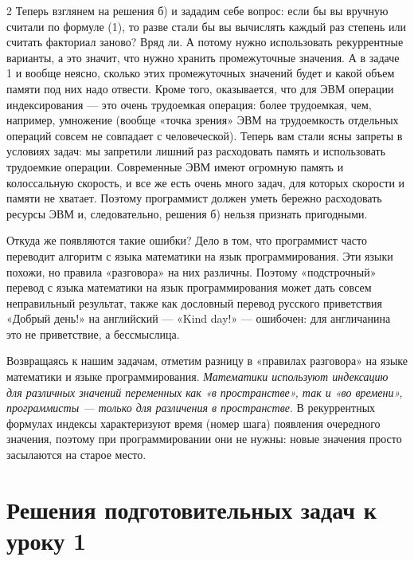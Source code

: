 \begin{multicols}{2}
\indent Теперь взглянем на решения б) и зададим себе вопрос: если бы вы вручную считали по формуле (1), то разве стали бы вы вычислять каждый раз степень или считать факториал заново? Вряд ли. А потому нужно использовать рекуррентные варианты, а это значит, что нужно хранить промежуточные значения. А в задаче 1 и вообще неясно, сколько этих промежуточных значений будет и какой объем памяти под них надо отвести. Кроме того, оказывается, что для ЭВМ операции индексирования — это очень трудоемкая операция: более трудоемкая, чем, например, умножение (вообще «точка зрения» ЭВМ на трудоемкость отдельных операций совсем не совпадает с человеческой). Теперь вам стали ясны запреты в условиях задач: мы запретили лишний раз расходовать память и использовать трудоемкие операции. Современные ЭВМ имеют огромную память и колоссальную скорость, и все же есть очень много задач, для которых скорости и памяти не хватает. Поэтому программист должен уметь бережно расходовать ресурсы ЭВМ и, следовательно, решения б) нельзя признать пригодными.

\indent Откуда же появляются такие ошибки? Дело в том, что программист часто переводит алгоритм с языка математики на язык программирования. Эти языки похожи, но правила «разговора» на них различны. Поэтому «подстрочный» перевод с языка математики на язык программирования может дать совсем неправильный результат, также как дословный перевод русского приветствия «Добрый день!» на английский — «Kind day!» — ошибочен: для англичанина это не приветствие, а бессмыслица.

\indent Возвращаясь к нашим задачам, отметим разницу в «правилах разговора» на языке математики и языке программирования. \textit{Математики используют индексацию для различных значений переменных как «в пространстве», так и «во времени», программисты — только для различения в пространстве}. В рекуррентных формулах индексы характеризуют время (номер шага) появления очередного значения, поэтому при программировании 
они не нужны: новые значения просто засылаются на старое место.

\vfill
\end{multicols} %

\clearpage
\setcounter{page}{54}
\setlength{\tabcolsep}{10pt} %
\renewcommand{\arraystretch}{1.5} %

\centering
\section*{Решения подготовительных задач к уроку 1}

